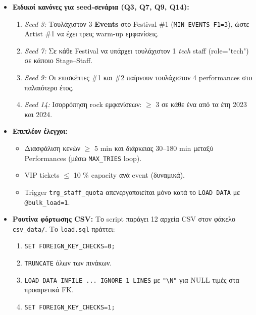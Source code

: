 \documentclass[a4paper,12pt]{article}
\begin{document}
\begin{itemize}
  \item \textbf{Ειδικοί κανόνες για seed-σενάρια (Q3, Q7, Q9, Q14):}
        \begin{enumerate}
          \item \emph{Seed 3:} Τουλάχιστον 3 \textbf{Events} στο
                Festival \#1 (\texttt{MIN\_EVENTS\_F1=3}), ώστε
                Artist \#1 να έχει τρεις warm-up εμφανίσεις.
          \item \emph{Seed 7:} Σε κάθε Festival να υπάρχει
                τουλάχιστον 1 \emph{tech} staff (role="tech") σε
                κάποιο Stage–Staff.
          \item \emph{Seed 9:} Οι επισκέπτες \#1 και \#2 παίρνουν
                τουλάχιστον 4 performances στο παλαιότερο έτος.
          \item \emph{Seed 14:} Ισορρόπηση rock εμφανίσεων:
                \(\ge\) 3 σε κάθε ένα από τα έτη 2023 και 2024.
        \end{enumerate}

  \item \textbf{Επιπλέον έλεγχοι:}
        \begin{itemize}
          \item Διασφάλιση κενών $\ge$ 5 min και διάρκειας 30–180 min
                μεταξύ Performances (μέσω \texttt{MAX\_TRIES} loop).
          \item VIP tickets $\le$ 10 \% capacity ανά event (δυναμικά).
          \item Trigger \texttt{trg\_staff\_quota} απενεργοποιείται μόνο
                κατά το \texttt{LOAD DATA} με \texttt{@bulk\_load=1}.
        \end{itemize}

  \item \textbf{Ρουτίνα φόρτωσης CSV:}  
        Το script παράγει 12 αρχεία CSV στον φάκελο
        \texttt{csv\_data/}.  Το \texttt{load.sql} πράττει:
        \begin{enumerate}
          \item \texttt{SET FOREIGN\_KEY\_CHECKS=0;}
          \item \texttt{TRUNCATE} όλων των πινάκων.
          \item \texttt{LOAD DATA INFILE ... IGNORE 1 LINES}
                με \texttt{"\textbackslash N"} για NULL τιμές
                στα προαιρετικά FK.
          \item \texttt{SET FOREIGN\_KEY\_CHECKS=1;}
        \end{enumerate}


\end{itemize}
\end{document}
